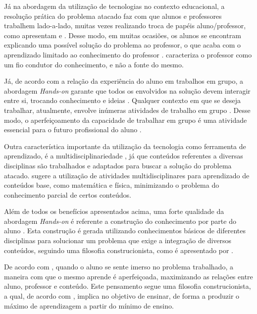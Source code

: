 Já na abordagem da utilização de tecnologias no contexto educacional, a resolução prática do problema atacado faz com que alunos e professores trabalhem lado-a-lado, muitas vezes realizando troca de papéis aluno/professor, como apresentam \cite{construcionismoPapert} e \cite{daMaquinaDeEnsinarAMaquinaDeAprender}. Desse modo, em muitas ocasiões, os alunos se encontram explicando uma possível solução do problema ao professor, o que acaba com o aprendizado limitado ao conhecimento do professor \cite{PCsEConstrucionismo}. \cite{construcionismoPapert} caracteriza o professor como um fio condutor do conhecimento, e não a fonte do mesmo.

Já, de acordo com a relação da experiência do aluno em trabalhos em grupo, a abordagem \textit{Hands-on} garante que todos os envolvidos na solução devem interagir entre si, trocando conhecimento e ideias \cite{teachingWithRoboticKit}. Qualquer contexto em que se deseja trabalhar, atualmente, envolve inúmeras atividades de trabalho em grupo \cite{teachingWithRoboticKit}. Desse modo, o aperfeiçoamento da capacidade de trabalhar em grupo é uma atividade essencial para o futuro profissional do aluno \cite{PCsEConstrucionismo}.

Outra característica importante da utilização da tecnologia como ferramenta de aprendizado, é a multidisciplinariedade \cite{analiseFerramentaEnsinoComputacao}, já que conteúdos referentes a diversas disciplinas são trabalhados e adaptados para buscar a solução do problema atacado. \cite{teachingWithRoboticKit} sugere a utilização de atividades multidisciplinares para aprendizado de conteúdos base, como matemática e física, minimizando o problema do conhecimento parcial de certos conteúdos.

Além de todos os benefícios apresentados acima, uma forte qualidade da abordagem \textit{Hands-on} é referente a construção do conhecimento por parte do aluno \cite{PCsEConstrucionismo}. Esta construção é gerada utilizando conhecimentos básicos de diferentes disciplinas para solucionar um problema que exige a integração de diversos conteúdos, seguindo uma filosofia construcionista, como é apresentado por \cite{construcionismoPapert}.
 

	De acordo com \cite{construcionismoPapert}, quando o aluno se sente imerso no problema trabalhado, a maneira com que o mesmo aprende é aperfeiçoada, maximizando as relações entre aluno, professor e conteúdo. Este pensamento segue uma filosofia construcionista, a qual, de acordo com \cite{construcionismoPapert}, implica no objetivo de ensinar, de forma a produzir o máximo de aprendizagem a partir do mínimo de ensino.

